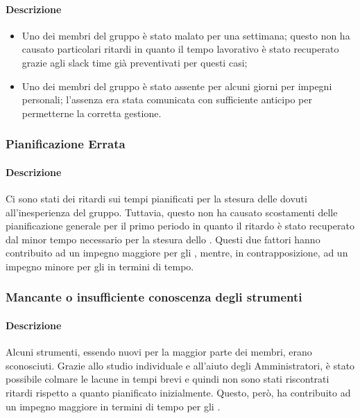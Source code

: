 \paragraph {Descrizione}
\begin{itemize}
	\item Uno dei membri del gruppo è stato malato per una settimana; questo non ha causato particolari ritardi in quanto il tempo lavorativo è stato recuperato grazie agli slack time già preventivati per questi casi;
	\item Uno dei membri del gruppo è stato assente per alcuni giorni per impegni personali; l'assenza era stata comunicata con sufficiente anticipo per permetterne la corretta gestione.
\end{itemize}

\subsubsection{Pianificazione Errata}
\paragraph{Descrizione}
Ci sono stati dei ritardi sui tempi pianificati per la stesura delle \NdP{} dovuti all'inesperienza del gruppo. Tuttavia, questo non ha causato scostamenti delle pianificazione generale per il primo periodo in quanto il ritardo è stato recuperato dal minor tempo necessario per la stesura dello \SdF{}. Questi due fattori hanno contribuito ad un impegno maggiore per gli \adms{}, mentre, in contrapposizione, ad un impegno minore per gli \anas{} in termini di tempo.

\subsubsection{Mancante o insufficiente conoscenza degli strumenti}
\paragraph {Descrizione}
Alcuni strumenti, essendo nuovi per la maggior parte dei membri, erano sconosciuti. Grazie allo studio individuale e all'aiuto degli Amministratori, è stato possibile colmare le lacune in tempi brevi e quindi non sono stati riscontrati ritardi rispetto a quanto pianificato inizialmente. Questo, però, ha contribuito ad un impegno maggiore in termini di tempo per gli \adms{}.